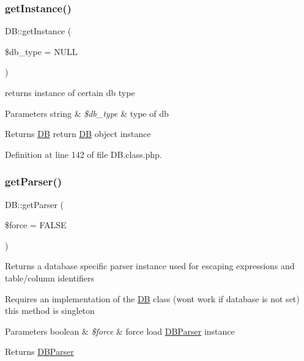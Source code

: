 \hypertarget{classDB_a36df3da4b06cd9d45feccb6b82e612c8}{}\label{classDB_a36df3da4b06cd9d45feccb6b82e612c8} 
\subsubsection{\texorpdfstring{get\+Instance()}{getInstance()}}
{\footnotesize\ttfamily D\+B\+::get\+Instance (\begin{DoxyParamCaption}\item[{}]{\$db\+\_\+type = {\ttfamily NULL} }\end{DoxyParamCaption})}

returns instance of certain db type 
\begin{DoxyParams}[1]{Parameters}
string & {\em \$db\+\_\+type} & type of db \\
\hline
\end{DoxyParams}
\begin{DoxyReturn}{Returns}
\hyperlink{classDB}{DB} return \hyperlink{classDB}{DB} object instance 
\end{DoxyReturn}


Definition at line 142 of file D\+B.\+class.\+php.

\hypertarget{classDB_abbcecd47d956cd069e3caa45c600dda4}{}\label{classDB_abbcecd47d956cd069e3caa45c600dda4} 
\subsubsection{\texorpdfstring{get\+Parser()}{getParser()}}
{\footnotesize\ttfamily D\+B\+::get\+Parser (\begin{DoxyParamCaption}\item[{}]{\$force = {\ttfamily FALSE} }\end{DoxyParamCaption})}

Returns a database specific parser instance used for escaping expressions and table/column identifiers

Requires an implementation of the \hyperlink{classDB}{DB} class (won\textquotesingle{}t work if database is not set) this method is singleton


\begin{DoxyParams}[1]{Parameters}
boolean & {\em \$force} & force load \hyperlink{classDBParser}{D\+B\+Parser} instance \\
\hline
\end{DoxyParams}
\begin{DoxyReturn}{Returns}
\hyperlink{classDBParser}{D\+B\+Parser} 
\end{DoxyReturn}


